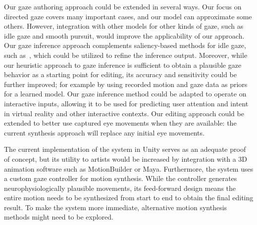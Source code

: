 Our gaze authoring approach could be extended in several ways. 
Our focus on directed gaze covers many important cases, and our model can approximate some others. However, integration with other models for other kinds of gaze, such as idle gaze and smooth pursuit, would improve the applicability of our approach.
Our gaze inference approach complements saliency-based methods for idle gaze, such as~\cite{peters2003bottomup}, which could be utilized to refine the inference output. Moreover, while our heuristic approach to gaze inference is sufficient to obtain a plausible gaze behavior as a starting point for editing, its accuracy and sensitivity could be further improved; for example by using recorded motion and gaze data as priors for a learned model.
Our gaze inference method could be adapted to operate on interactive inputs, allowing it to be used for predicting user attention and intent in virtual reality and other interactive contexts.
Our editing approach could be extended to better use captured eye movements when they are available: the current synthesis approach will replace any initial eye movements. 

The current implementation of the system in Unity serves as an adequate proof of concept, but its utility to artists would be increased by integration with a 3D animation software such as MotionBuilder or Maya. Furthermore, the system uses a custom gaze controller for motion synthesis. While the controller generates neurophysiologically plausible movements, its feed-forward design means the entire motion needs to be synthesized from start to end to obtain the final editing result. To make the system more immediate, alternative motion synthesis methods might need to be explored.

